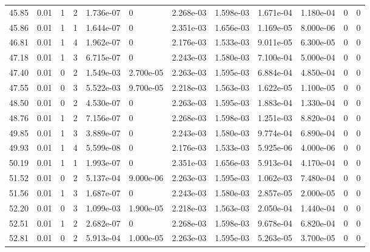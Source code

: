 \documentclass[preview]{standalone}
\begin{document}
{{{\begin{tabular}{L{1.2cm}C{1.2cm} C{0.3cm}C{0.5cm} C{1.4cm}C{1.4cm} C{1.4cm}C{1.4cm} C{1.6cm}C{1.6cm} C{1.6cm}C{1.6cm}}
  45.85  &  0.01  & 1     &  2 &  1.736e-07  & 0  &  2.268e-03&   1.598e-03& 1.671e-04 & 1.180e-04   &  0 & 0  \\ 
  45.86  &  0.01  & 1     &  1 &  1.644e-07  & 0  &  2.351e-03&   1.656e-03& 1.169e-05 & 8.000e-06   &  0 & 0  \\ 
  46.81  &  0.01  & 1     &  4 &  1.962e-07  & 0  &  2.176e-03&   1.533e-03& 9.011e-05 & 6.300e-05   &  0 & 0  \\ 
  47.18  &  0.01  & 1     &  3 &  6.715e-07  & 0  &  2.243e-03&   1.580e-03& 7.100e-04 & 5.000e-04   &  0 & 0  \\ 
  47.40  &  0.01  & 0     &  2 &  1.549e-03  & 2.700e-05  &  2.263e-03&   1.595e-03& 6.884e-04 & 4.850e-04   &  0 & 0  \\ 
  47.55  &  0.01  & 0     &  3 &  5.522e-03  & 9.700e-05  &  2.218e-03&   1.563e-03& 1.622e-05 & 1.100e-05   &  0 & 0  \\ 
  48.50  &  0.01  & 0     &  2 &  4.530e-07  & 0  &  2.263e-03&   1.595e-03& 1.883e-04 & 1.330e-04   &  0 & 0  \\ 
  48.76  &  0.01  & 1     &  2 &  7.156e-07  & 0  &  2.268e-03&   1.598e-03& 1.251e-03 & 8.820e-04   &  0 & 0  \\ 
  49.85  &  0.01  & 1     &  3 &  3.889e-07  & 0  &  2.243e-03&   1.580e-03& 9.774e-04 & 6.890e-04   &  0 & 0  \\ 
  49.93  &  0.01  & 1     &  4 &  5.599e-08  & 0  &  2.176e-03&   1.533e-03& 5.925e-06 & 4.000e-06   &  0 & 0  \\ 
  50.19  &  0.01  & 1     &  1 &  1.993e-07  & 0  &  2.351e-03&   1.656e-03& 5.913e-04 & 4.170e-04   &  0 & 0  \\ 
  51.52  &  0.01  & 0     &  2 &  5.137e-04  & 9.000e-06  &  2.263e-03&   1.595e-03& 1.062e-03 & 7.480e-04   &  0 & 0  \\ 
  51.56  &  0.01  & 1     &  3 &  1.687e-07  & 0  &  2.243e-03&   1.580e-03& 2.857e-05 & 2.000e-05   &  0 & 0  \\ 
  52.20  &  0.01  & 0     &  3 &  1.099e-03  & 1.900e-05  &  2.218e-03&   1.563e-03& 2.050e-04 & 1.440e-04   &  0 & 0  \\ 
  52.51  &  0.01  & 1     &  2 &  2.682e-07  & 0  &  2.268e-03&   1.598e-03& 9.678e-04 & 6.820e-04   &  0 & 0  \\ 
  52.81  &  0.01  & 0     &  2 &  5.913e-04  & 1.000e-05  &  2.263e-03&   1.595e-03& 5.263e-05 & 3.700e-05   &  0 & 0  \\ 
\hline 
\end{tabular} 

}}}
\end{document}
